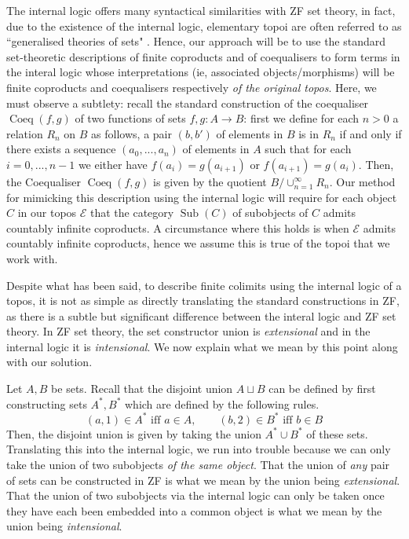 \documentclass{birkjour}
\theoremstyle{plain}
\theoremstyle{definition}
\newcommand{\call}[1]{\mathcal{#1}}
\newcommand{\lto}{\longrightarrow}
\begin{document}
	The internal logic offers many syntactical similarities with ZF set theory, in fact, due to the existence of the internal logic, elementary topoi are often referred to as ``generalised theories of sets" \cite[\S Prologue, page 1]{MM}. Hence, our approach will be to use the standard set-theoretic descriptions of finite coproducts and of coequalisers to form terms in the interal logic whose interpretations (ie, associated objects/morphisms) will be finite coproducts and coequalisers respectively \emph{of the original topos}. Here, we must observe a subtlety: recall the standard construction of the coequaliser $\operatorname{Coeq}(f,g)$ of two functions of sets $f,g:A \lto B$: first we define for each $n > 0$ a relation $R_n$ on $B$ as follows, a pair $(b,b')$ of elements in $B$ is in $R_n$ if and only if there exists a sequence $(a_0,...,a_n)$ of elements in $A$ such that for each $i = 0,...,n-1$ we either have $f(a_i) = g(a_{i+1})$ or $f(a_{i+1}) = g(a_i)$. Then, the Coequaliser $\operatorname{Coeq}(f,g)$ is given by the quotient $B/\cup_{n = 1}^\infty R_n$. Our method for mimicking this description using the internal logic will require for each object $C$ in our topos $\call{E}$ that the category $\operatorname{Sub}(C)$ of subobjects of $C$ admits countably infinite coproducts. A circumstance where this holds is when $\call{E}$ admits countably infinite coproducts, hence we assume this is true of the topoi that we work with.
	
	Despite what has been said, to describe finite colimits using the internal logic of a topos, it is not as simple as directly translating the standard constructions in ZF, as there is a subtle but significant difference between the interal logic and ZF set theory. In ZF set theory, the set constructor union is \emph{extensional} and in the internal logic it is \emph{intensional}. We now explain what we mean by this point along with our solution.
	
	Let $A,B$ be sets. Recall that the disjoint union $A \sqcup B$ can be defined by first constructing sets $A^\ast,B^\ast$ which are defined by the following rules.
	\begin{equation}
		(a,1) \in A^\ast \text{ iff }a \in A,\qquad (b,2) \in B^\ast \text{ iff } b \in B
	\end{equation}
	Then, the disjoint union is given by taking the union $A^\ast \cup B^\ast$ of these sets. Translating this into the internal logic, we run into trouble because we can only take the union of two subobjects \emph{of the same object}. That the union of \emph{any} pair of sets can be constructed in ZF is what we mean by the union being \emph{extensional}. That the union of two subobjects via the internal logic can only be taken once they have each been embedded into a common object is what we mean by the union being \emph{intensional}.
	
\end{document}
